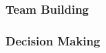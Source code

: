 \documentclass{article}
\begin{document}
\begin{comment}
\wss{You can set target metrics for attendance, commits, etc.  What are the
consequences if someone doesn't hit their targets?  Do they need to bring the
coffee to the next team meeting?  Does the team need to make an appointment with
their TA, or the instructor?  Are there incentives for reaching targets early?}
\end{comment}

\subsubsection*{Team Building}

\begin{comment}
\wss{How will you build team cohesion (fun time, group rituals, etc.)? }
\end{comment}

\subsubsection*{Decision Making} 

\begin{comment}
\wss{How will you make decisions in your group? Consensus?  Vote? How will you
handle disagreements? }
\end{comment}
\end{document}
